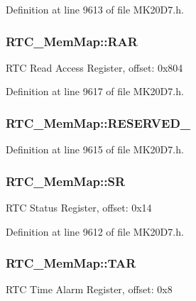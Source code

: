 Definition at line 9613 of file M\+K20\+D7.\+h.

\subsubsection[{\texorpdfstring{R\+AR}{RAR}}]{ R\+T\+C\+\_\+\+Mem\+Map\+::\+R\+AR}\hypertarget{struct_r_t_c___mem_map_a59094243dc3c0849c9bc20a2a809086c}{}\label{struct_r_t_c___mem_map_a59094243dc3c0849c9bc20a2a809086c}
R\+TC Read Access Register, offset\+: 0x804 

Definition at line 9617 of file M\+K20\+D7.\+h.

\subsubsection[{\texorpdfstring{R\+E\+S\+E\+R\+V\+E\+D\+\_\+0}{RESERVED_0}}]{ R\+T\+C\+\_\+\+Mem\+Map\+::\+R\+E\+S\+E\+R\+V\+E\+D\+\_}\hypertarget{struct_r_t_c___mem_map_a26ffeb9960ce866c1ad43ded6153d778}{}\label{struct_r_t_c___mem_map_a26ffeb9960ce866c1ad43ded6153d778}


Definition at line 9615 of file M\+K20\+D7.\+h.

\subsubsection[{\texorpdfstring{SR}{SR}}]{ R\+T\+C\+\_\+\+Mem\+Map\+::\+SR}\hypertarget{struct_r_t_c___mem_map_a82faed2f609de35e3b27d5fd27ba82e2}{}\label{struct_r_t_c___mem_map_a82faed2f609de35e3b27d5fd27ba82e2}
R\+TC Status Register, offset\+: 0x14 

Definition at line 9612 of file M\+K20\+D7.\+h.

\subsubsection[{\texorpdfstring{T\+AR}{TAR}}]{ R\+T\+C\+\_\+\+Mem\+Map\+::\+T\+AR}\hypertarget{struct_r_t_c___mem_map_a500ab794376810b97e2b2e01658f330c}{}\label{struct_r_t_c___mem_map_a500ab794376810b97e2b2e01658f330c}
R\+TC Time Alarm Register, offset\+: 0x8 


